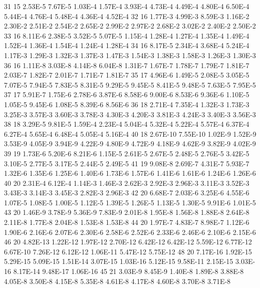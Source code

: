     31 15 	2.53E-5 	7.67E-5 	1.03E-4 	1.57E-4 	3.93E-4 	4.73E-4 	4.49E-4 	4.80E-4 	6.50E-4 	5.44E-4 	4.76E-4 	5.48E-4 	4.36E-4 	4.52E-4
    32 16 	1.77E-3 	4.99E-3 	8.59E-3 	1.16E-2 	2.30E-2 	2.51E-2 	2.54E-2 	2.65E-2 	2.99E-2 	2.97E-2 	2.68E-2 	3.02E-2 	2.40E-2 	2.50E-2
    33 16 	8.11E-6 	2.38E-5 	3.52E-5 	5.07E-5 	1.15E-4 	1.28E-4 	1.27E-4 	1.35E-4 	1.49E-4 	1.52E-4 	1.36E-4 	1.54E-4 	1.24E-4 	1.28E-4
    34 16 	8.17E-5 	2.34E-4 	3.68E-4 	5.24E-4 	1.17E-3 	1.29E-3 	1.32E-3 	1.37E-3 	1.47E-3 	1.54E-3 	1.38E-3 	1.58E-3 	1.26E-3 	1.30E-3
    36 16 	1.11E-8 	3.03E-8 	4.14E-8 	6.04E-8 	1.31E-7 	1.67E-7 	1.78E-7 	1.79E-7 	1.81E-7 	2.03E-7 	1.82E-7 	2.01E-7 	1.71E-7 	1.81E-7
    35 17	4.96E-6 	1.49E-5 	2.08E-5 	3.05E-5 	7.07E-5 	7.94E-5 	7.83E-5 	8.31E-5 	9.29E-5 	9.45E-5 	8.41E-5 	9.48E-5 	7.63E-5 	7.95E-5
    37 17	5.91E-7 	1.75E-6 	2.78E-6 	3.87E-6 	8.58E-6 	9.00E-6 	8.53E-6 	9.36E-6 	1.10E-5 	1.05E-5 	9.45E-6 	1.08E-5 	8.39E-6 	8.56E-6
    36 18	2.71E-4 	7.35E-4 	1.32E-3 	1.73E-3 	3.25E-3 	3.57E-3 	3.60E-3 	3.78E-3 	4.30E-3 	4.20E-3 	3.81E-3 	4.24E-3 	3.40E-3 	3.56E-3
    38 18	3.29E-5 	9.81E-5 	1.59E-4 	2.23E-4 	5.04E-4 	5.32E-4 	5.22E-4 	5.57E-4 	6.37E-4 	6.27E-4 	5.65E-4 	6.48E-4 	5.05E-4 	5.16E-4
    40 18	2.67E-10 	7.55E-10 	1.02E-9 	1.52E-9 	3.53E-9 	4.05E-9 	3.94E-9 	4.22E-9 	4.80E-9 	4.72E-9 	4.18E-9 	4.62E-9 	3.82E-9 	4.02E-9
    39 19 	1.73E-6 	5.20E-6 	8.21E-6 	1.15E-5 	2.61E-5 	2.67E-5 	2.48E-5 	2.76E-5 	3.42E-5 	3.10E-5 	2.77E-5 	3.17E-5 	2.44E-5 	2.49E-5
    41 19 	9.08E-8 	2.69E-7 	4.31E-7 	5.93E-7 	1.32E-6 	1.35E-6 	1.25E-6 	1.40E-6 	1.73E-6 	1.57E-6 	1.41E-6 	1.61E-6 	1.24E-6 	1.26E-6
    40 20	2.31E-4 	6.12E-4 	1.14E-3 	1.46E-3 	2.62E-3 	2.92E-3 	2.96E-3 	3.11E-3 	3.52E-3 	3.43E-3 	3.14E-3 	3.45E-3 	2.82E-3 	2.96E-3
    42 20	6.68E-7 	2.03E-6 	3.25E-6 	4.55E-6 	1.07E-5 	1.08E-5 	1.00E-5 	1.12E-5 	1.39E-5 	1.26E-5 	1.13E-5 	1.30E-5 	9.91E-6 	1.01E-5
    43 20	1.46E-9 	3.78E-9 	5.36E-9 	7.83E-9 	2.01E-8 	1.95E-8 	1.56E-8 	1.88E-8 	2.64E-8 	2.11E-8 	1.77E-8 	2.04E-8 	1.53E-8 	1.53E-8
    44 20	1.97E-7 	4.83E-7 	8.98E-7 	1.12E-6 	1.90E-6 	2.16E-6 	2.07E-6 	2.30E-6 	2.58E-6 	2.52E-6 	2.33E-6 	2.46E-6 	2.10E-6 	2.15E-6
    46 20	4.82E-13 	1.22E-12 	1.97E-12 	2.70E-12 	6.42E-12 	6.42E-12 	5.59E-12 	6.77E-12 	6.67E-10 	7.26E-12 	6.12E-12 	1.06E-11 	5.47E-12 	5.75E-12
    48 20	7.17E-16 	1.92E-15 	5.29E-15 	5.09E-15 	1.51E-14 	3.07E-15 	1.03E-16 	5.12E-15 	9.58E-11 	2.15E-15 	3.03E-16 	8.17E-14 	9.48E-17 	1.06E-16
    45 21	3.03E-9 	8.45E-9 	1.40E-8 	1.89E-8 	3.88E-8 	4.05E-8 	3.50E-8 	4.15E-8 	5.35E-8 	4.61E-8 	4.17E-8 	4.60E-8 	3.70E-8 	3.71E-8
